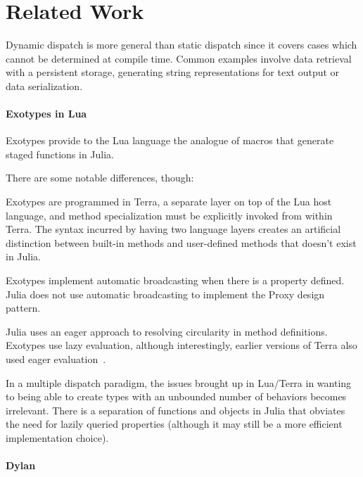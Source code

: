 \section{Related Work}

Dynamic dispatch is more general than static dispatch since it covers cases which cannot be determined at compile time.
Common examples involve data retrieval with a persistent storage, generating string representations for text output or data serialization.\cite{Shields1998}

\paragraph{Exotypes in Lua}
Exotypes\cite{exotypes} provide to the Lua language\cite{lua} the analogue of macros that generate staged functions\cite{stagedfunc} in Julia.

There are some notable differences, though:

Exotypes are programmed in Terra,\cite{terra} a separate layer on top of the Lua host language, and method specialization must be explicitly invoked from within Terra. The syntax incurred by having two language layers creates an artificial distinction between built-in methods and user-defined methods that doesn't exist in Julia.

Exotypes implement automatic broadcasting when there is a  property defined. Julia does not use automatic broadcasting to implement the Proxy design pattern.

Julia uses an eager approach to resolving circularity in method definitions. Exotypes use lazy evaluation, although interestingly, earlier versions of Terra also used eager evaluation~\cite{terra}.


In a multiple dispatch paradigm, the issues brought up in Lua/Terra in wanting to being able to create types with an unbounded number of behaviors becomes irrelevant. There is a separation of functions and objects in Julia that obviates the need for lazily queried properties (although it may still be a more efficient implementation choice).

\paragraph{Dylan}

